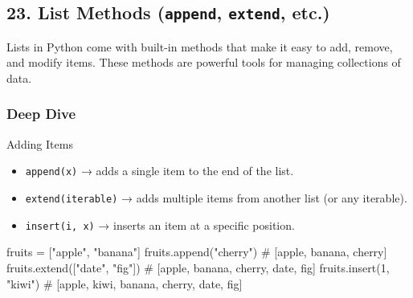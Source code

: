 \documentclass[
  letterpaper,
  DIV=11,
  numbers=noendperiod]{scrreprt}
\newenvironment{Shaded}{\begin{snugshade}}{\end{snugshade}}
\newcommand{\CommentTok}[1]{\textcolor[rgb]{0.37,0.37,0.37}{#1}}
\newcommand{\DecValTok}[1]{\textcolor[rgb]{0.68,0.00,0.00}{#1}}
\newcommand{\NormalTok}[1]{\textcolor[rgb]{0.00,0.23,0.31}{#1}}
\newcommand{\OperatorTok}[1]{\textcolor[rgb]{0.37,0.37,0.37}{#1}}
\newcommand{\StringTok}[1]{\textcolor[rgb]{0.13,0.47,0.30}{#1}}
\providecommand{\tightlist}{%
  \setlength{\itemsep}{0pt}\setlength{\parskip}{0pt}}
\begin{document}
\subsection{\texorpdfstring{23. List Methods (\texttt{append},
\texttt{extend},
etc.)}{23. List Methods (append, extend, etc.)}}\label{list-methods-append-extend-etc.}

Lists in Python come with built-in methods that make it easy to add,
remove, and modify items. These methods are powerful tools for managing
collections of data.

\subsubsection{Deep Dive}\label{deep-dive-23}

Adding Items

\begin{itemize}
\tightlist
\item
  \texttt{append(x)} → adds a single item to the end of the list.
\item
  \texttt{extend(iterable)} → adds multiple items from another list (or
  any iterable).
\item
  \texttt{insert(i,\ x)} → inserts an item at a specific position.
\end{itemize}

\begin{Shaded}
\begin{Highlighting}[]
\NormalTok{fruits }\OperatorTok{=}\NormalTok{ [}\StringTok{"apple"}\NormalTok{, }\StringTok{"banana"}\NormalTok{]}
\NormalTok{fruits.append(}\StringTok{"cherry"}\NormalTok{)     }\CommentTok{\# [\textquotesingle{}apple\textquotesingle{}, \textquotesingle{}banana\textquotesingle{}, \textquotesingle{}cherry\textquotesingle{}]}
\NormalTok{fruits.extend([}\StringTok{"date"}\NormalTok{, }\StringTok{"fig"}\NormalTok{])  }\CommentTok{\# [\textquotesingle{}apple\textquotesingle{}, \textquotesingle{}banana\textquotesingle{}, \textquotesingle{}cherry\textquotesingle{}, \textquotesingle{}date\textquotesingle{}, \textquotesingle{}fig\textquotesingle{}]}
\NormalTok{fruits.insert(}\DecValTok{1}\NormalTok{, }\StringTok{"kiwi"}\NormalTok{)    }\CommentTok{\# [\textquotesingle{}apple\textquotesingle{}, \textquotesingle{}kiwi\textquotesingle{}, \textquotesingle{}banana\textquotesingle{}, \textquotesingle{}cherry\textquotesingle{}, \textquotesingle{}date\textquotesingle{}, \textquotesingle{}fig\textquotesingle{}]}
\end{Highlighting}
\end{Shaded}
\end{document}
